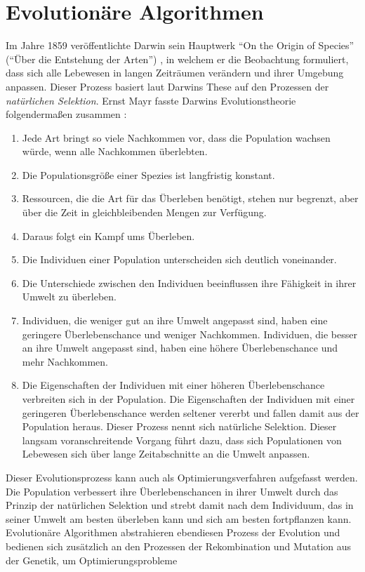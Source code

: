 \chapter{Evolutionäre Algorithmen}
Im Jahre 1859 veröffentlichte Darwin sein Hauptwerk "`On the Origin of Species"' ("`Über die Entstehung der Arten"') \cite{Darwin:1}, in welchem er die Beobachtung formuliert, dass sich alle Lebewesen in langen Zeiträumen verändern und ihrer Umgebung anpassen. Dieser Prozess basiert laut Darwins These auf den Prozessen der \textit{natürlichen Selektion}. Ernst Mayr fasste Darwins Evolutionstheorie folgendermaßen zusammen \cite{Mayr:1}: 

\begin{enumerate}
	\item Jede Art bringt so viele Nachkommen vor, dass die Population wachsen würde, wenn alle Nachkommen überlebten.
	\item Die Populationsgröße einer Spezies ist langfristig konstant. 
	\item Ressourcen, die die Art für das Überleben benötigt, stehen nur begrenzt, aber über die Zeit in gleichbleibenden Mengen zur Verfügung. 
	\item Daraus folgt ein Kampf ums Überleben. 
	\item Die Individuen einer Population unterscheiden sich deutlich voneinander. 
	\item Die Unterschiede zwischen den Individuen beeinflussen ihre Fähigkeit in ihrer Umwelt zu überleben. 
	\item Individuen, die weniger gut an ihre Umwelt angepasst sind, haben eine geringere Überlebenschance und weniger Nachkommen. Individuen, die besser an ihre Umwelt angepasst sind, haben eine höhere Überlebenschance und mehr Nachkommen.
	\item Die Eigenschaften der Individuen mit einer höheren Überlebenschance verbreiten sich in der Population. Die Eigenschaften der Individuen mit einer geringeren Überlebenschance werden seltener vererbt und fallen damit aus der Population heraus. Dieser Prozess nennt sich natürliche Selektion. Dieser langsam voranschreitende Vorgang führt dazu, dass sich Populationen von Lebewesen sich über lange Zeitabschnitte an die Umwelt anpassen. 
\end{enumerate}

Dieser Evolutionsprozess kann auch als Optimierungsverfahren aufgefasst werden. Die Population verbessert ihre Überlebenschancen in ihrer Umwelt durch das Prinzip der natürlichen Selektion und strebt damit nach dem Individuum, das in seiner Umwelt am besten überleben kann und sich am besten fortpflanzen kann. Evolutionäre Algorithmen abstrahieren ebendiesen Prozess der Evolution und bedienen sich zusätzlich an den Prozessen der Rekombination und Mutation aus der Genetik, um Optimierungsprobleme 

